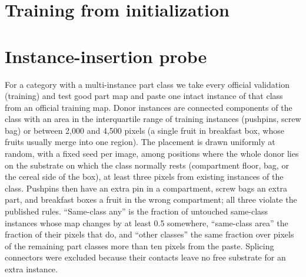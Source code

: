 

\begin{table}[t]
\centering
\caption{Real pushpin defects at training-fixed operating points: recall of defective compartments, intact compartments opened per anomalous image, compartments opened per good image, and scene alarm rates.}
\label{tab:native_op}
\footnotesize\setlength{\tabcolsep}{4pt}

\end{table}

\section{Training from initialization}
\label{sec:supp_scratch}


\section{Instance-insertion probe}
\label{sec:supp_insertion}
For a category with a multi-instance part class we take every official validation (training) and test good part map and paste one intact instance of that class from an official training map. Donor instances are connected components of the class with an area in the interquartile range of training instances (pushpins, screw bag) or between 2{,}000 and 4{,}500 pixels (a single fruit in breakfast box, whose fruits usually merge into one region). The placement is drawn uniformly at random, with a fixed seed per image, among positions where the whole donor lies on the substrate on which the class normally rests (compartment floor, bag, or the cereal side of the box), at least three pixels from existing instances of the class. Pushpins then have an extra pin in a compartment, screw bags an extra part, and breakfast boxes a fruit in the wrong compartment; all three violate the published rules. ``Same-class any'' is the fraction of untouched same-class instances whose map changes by at least 0.5 somewhere, ``same-class area'' the fraction of their pixels that do, and ``other classes'' the same fraction over pixels of the remaining part classes more than ten pixels from the paste. Splicing connectors were excluded because their contacts leave no free substrate for an extra instance.
\begin{table}[t]
\centering
\caption{Instance-insertion probe on part maps (composition branch). Instance AUROC ranks the pasted instance against the untouched instances of its class.}
\label{tab:insertion}
\footnotesize\setlength{\tabcolsep}{4pt}

\end{table}

